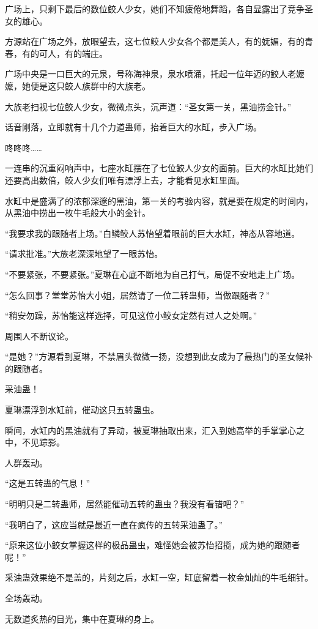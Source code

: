 \begin{this_body}
广场上，只剩下最后的数位鲛人少女，她们不知疲倦地舞蹈，各自显露出了竞争圣女的雄心。

方源站在广场之外，放眼望去，这七位鲛人少女各个都是美人，有的妩媚，有的青春，有的可人，有的端庄。

广场中央是一口巨大的元泉，号称海神泉，泉水喷涌，托起一位年迈的鲛人老嬷嬷，她便是这只鲛人族群中的大族老。

大族老扫视七位鲛人少女，微微点头，沉声道：“圣女第一关，黑油捞金针。”

话音刚落，立即就有十几个力道蛊师，抬着巨大的水缸，步入广场。

咚咚咚……

一连串的沉重闷响声中，七座水缸摆在了七位鲛人少女的面前。巨大的水缸比她们还要高出数倍，鲛人少女们唯有漂浮上去，才能看见水缸里面。

水缸中是盛满了的浓郁深邃的黑油，第一关的考验内容，就是要在规定的时间内，从黑油中捞出一枚牛毛般大小的金针。

“我要求我的跟随者上场。”白鳞鲛人苏怡望着眼前的巨大水缸，神态从容地道。

“请求批准。”大族老深深地望了一眼苏怡。

“不要紧张，不要紧张。”夏琳在心底不断地为自己打气，局促不安地走上广场。

“怎么回事？堂堂苏怡大小姐，居然请了一位二转蛊师，当做跟随者？”

“稍安勿躁，苏怡能这样选择，可见这位小鲛女定然有过人之处啊。”

周围人不断议论。

“是她？”方源看到夏琳，不禁眉头微微一扬，没想到此女成为了最热门的圣女候补的跟随者。

采油蛊！

夏琳漂浮到水缸前，催动这只五转蛊虫。

瞬间，水缸内的黑油就有了异动，被夏琳抽取出来，汇入到她高举的手掌掌心之中，不见踪影。

人群轰动。

“这是五转蛊的气息！”

“明明只是二转蛊师，居然能催动五转的蛊虫？我没有看错吧？”

“我明白了，这应当就是最近一直在疯传的五转采油蛊了。”

“原来这位小鲛女掌握这样的极品蛊虫，难怪她会被苏怡招揽，成为她的跟随者呢！”

采油蛊效果绝不是盖的，片刻之后，水缸一空，缸底留着一枚金灿灿的牛毛细针。

全场轰动。

无数道炙热的目光，集中在夏琳的身上。


\end{this_body}
